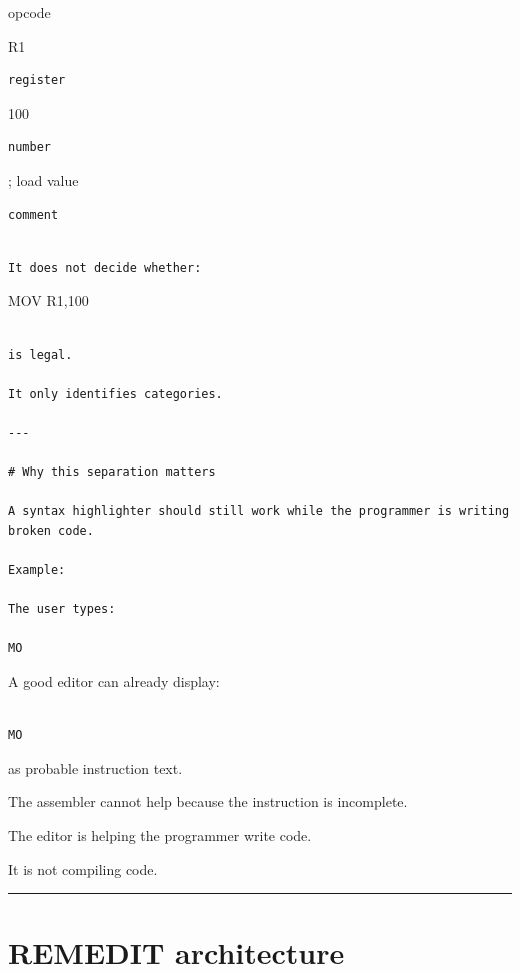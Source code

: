 \documentclass[
  oneside,
  openany]{book}
\begin{document}
opcode 

R1

\begin{verbatim}
register
\end{verbatim}

100

\begin{verbatim}
number
\end{verbatim}

; load value

\begin{verbatim}
comment
\end{verbatim}

\begin{verbatim}

It does not decide whether:
\end{verbatim}

MOV R1,100

\begin{verbatim}

is legal.

It only identifies categories.

---

# Why this separation matters

A syntax highlighter should still work while the programmer is writing broken code.

Example:

The user types:

MO
\end{verbatim}

A good editor can already display:

\begin{verbatim}

MO
\end{verbatim}

as probable instruction text.

The assembler cannot help because the instruction is incomplete.

The editor is helping the programmer write code.

It is not compiling code.

\begin{center}\rule{0.5\linewidth}{0.5pt}\end{center}

\hypertarget{remedit-architecture}{%
\section{REMEDIT architecture}\label{remedit-architecture}}
\end{document}
